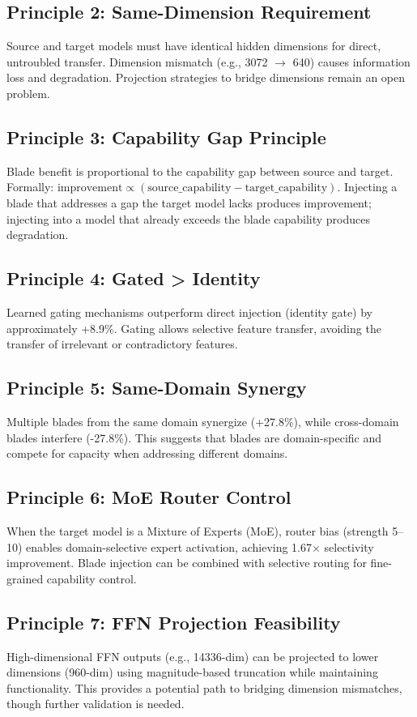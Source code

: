 \documentclass[11pt,a4paper]{article}
\begin{document}
\subsection{Principle 2: Same-Dimension Requirement}
Source and target models must have identical hidden dimensions for direct, untroubled transfer. Dimension mismatch (e.g., 3072 $\to$ 640) causes information loss and degradation. Projection strategies to bridge dimensions remain an open problem.

\subsection{Principle 3: Capability Gap Principle}
Blade benefit is proportional to the capability gap between source and target. Formally: $\text{improvement} \propto (\text{source\_capability} - \text{target\_capability})$. Injecting a blade that addresses a gap the target model lacks produces improvement; injecting into a model that already exceeds the blade capability produces degradation.

\subsection{Principle 4: Gated > Identity}
Learned gating mechanisms outperform direct injection (identity gate) by approximately +8.9\%. Gating allows selective feature transfer, avoiding the transfer of irrelevant or contradictory features.

\subsection{Principle 5: Same-Domain Synergy}
Multiple blades from the same domain synergize (+27.8\%), while cross-domain blades interfere (-27.8\%). This suggests that blades are domain-specific and compete for capacity when addressing different domains.

\subsection{Principle 6: MoE Router Control}
When the target model is a Mixture of Experts (MoE), router bias (strength 5--10) enables domain-selective expert activation, achieving 1.67$\times$ selectivity improvement. Blade injection can be combined with selective routing for fine-grained capability control.

\subsection{Principle 7: FFN Projection Feasibility}
High-dimensional FFN outputs (e.g., 14336-dim) can be projected to lower dimensions (960-dim) using magnitude-based truncation while maintaining functionality. This provides a potential path to bridging dimension mismatches, though further validation is needed.
\end{document}
